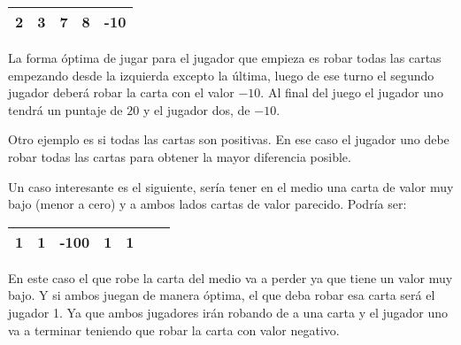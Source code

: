\begin{center}
\begin{tabular}{|c|c|c|c|c|}
\hline
2 & 3 & 7 & 8 & -10 \\
\hline
\end{tabular}
\end{center}

La forma óptima de jugar para el jugador que empieza es robar todas las cartas empezando desde la izquierda excepto la última, luego de ese turno el segundo jugador deberá robar la carta con el valor $-10$. Al final del juego el jugador uno tendrá un puntaje de $20$ y el jugador dos, de $-10$.

Otro ejemplo es si todas las cartas son positivas. En ese caso el jugador uno debe robar todas las cartas para obtener la mayor diferencia posible.

Un caso interesante es el siguiente, sería tener en el medio una carta de valor muy bajo (menor a cero) y a ambos lados cartas de valor parecido. Podría ser:

\begin{center}
\begin{tabular}{|c|c|c|c|c|c|c|}
\hline
1 & 1 & -100 & 1 & 1 \\
\hline
\end{tabular}
\end{center}

En este caso el que robe la carta del medio va a perder ya que tiene un valor muy bajo. Y si ambos juegan de manera óptima, el que deba robar esa carta será el jugador 1. Ya que ambos jugadores irán robando de a una carta y el jugador uno va a terminar teniendo que robar la carta con valor negativo.